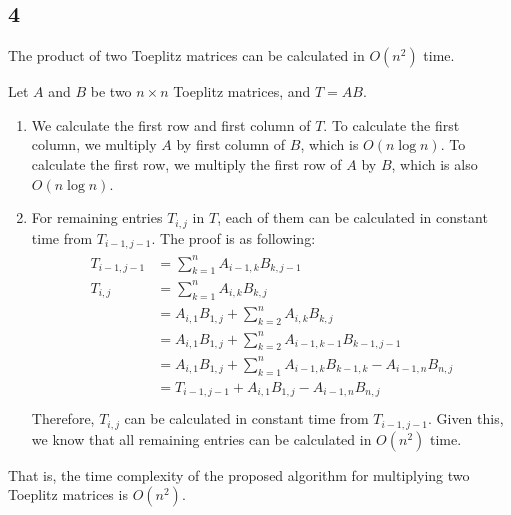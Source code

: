 \documentclass[paper=a4, fontsize=11pt]{scrartcl} %
\numberwithin{equation}{section} %
\numberwithin{figure}{section} %
\numberwithin{table}{section} %
\numberwithin{claimcounter}{section}
\begin{document}
\subsection*{4}
The product of two Toeplitz matrices can be calculated in $O(n^2)$ time.

Let $A$ and $B$ be two $n\times n$ Toeplitz matrices, and $T = AB$. 
\begin{enumerate}
  \item We calculate the first row and first column of $T$. To calculate the
    first column, we multiply $A$ by first column of $B$, which is $O(n\log n)$.
    To calculate the first row, we multiply the first row of $A$ by $B$, which
    is also $O(n\log n)$.
  \item For remaining entries $T_{i,j}$ in $T$, each of them can be calculated in constant 
    time from $T_{i-1, j-1}$. The proof is as following:
      \begin{align}
        \begin{split}
          T_{i-1, j-1} &= \sum_{k=1}^{n} A_{i-1, k} B_{k,j-1} \\
          T_{i, j} &= \sum_{k=1}^{n} A_{i, k} B_{k, j} \\
                &= A_{i,1}B_{1,j} + \sum_{k=2}^{n} A_{i, k} B_{k, j} \\
                &= A_{i,1}B_{1,j} + \sum_{k=2}^n A_{i-1, k-1} B_{k-1, j-1} \\
                &= A_{i,1}B_{1,j} + \sum_{k=1}^n A_{i-1, k} B_{k-1, k} -
                A_{i-1, n}B_{n,j} \\
                &= T_{i-1, j-1} + A_{i,1}B_{1,j} - A_{i-1, n}B_{n,j} \\
        \end{split}
      \end{align}
    Therefore, $T_{i, j}$ can be calculated in constant time from $T_{i-1,j-1}$.
    Given this, we know that all remaining entries can be calculated in $O(n^2)$
    time.
\end{enumerate}
That is, the time complexity of the proposed algorithm for multiplying two
Toeplitz matrices is $O(n^2)$.
\end{document}
